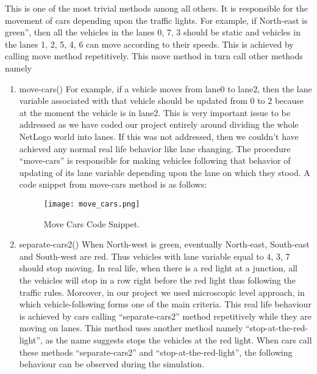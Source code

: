 \documentclass[11pt,a4paper]{article}
\begin{document}
This is one of the most trivial methods among all others. It is responsible for the movement of cars depending upon the traffic lights. For example, if North-east is green”, then all the vehicles in the lanes 0, 7, 3 should be static and vehicles in the lanes 1, 2, 5, 4, 6 can move according to their speeds. This is achieved by calling move method repetitively. This move method in turn call other methods namely\newline
\begin{enumerate}
\item move-cars()\newline
For example, if a vehicle moves from lane0 to lane2, then the lane variable associated with that vehicle should be updated from 0 to 2 because at the moment the vehicle is in lane2. This is very important issue to be addressed as we have coded our project entirely around dividing the whole NetLogo world into lanes. If this was not addressed, then we couldn’t have achieved any normal real life behavior like lane changing. The procedure “move-cars” is responsible for making vehicles following that behavior of updating of its lane variable depending upon the lane on which they stood.
A code snippet from move-cars method is as follows:

\begin{figure}[!ht]
\centering
\texttt{[image: move\_cars.png]}
\caption{\label{fig:mc}Move Cars Code Snippet.}
\end{figure}

\item separate-cars2()\newline
When North-west is green, eventually North-east, South-east and South-west are red. Thus vehicles with lane variable equal to 4, 3, 7 should stop moving. In real life, when there is a red light at a junction, all the vehicles will stop in a row right before the red light thus following the traffic rules.\newline
Moreover, in our project we used microscopic level approach, in which vehicle-following forms one of the main criteria. This real life behaviour is achieved by cars calling “separate-cars2” method repetitively while they are moving on lanes.\newline 
This method uses another method namely “stop-at-the-red-light”, as the name suggests stops the vehicles at the red light. When cars call these methods “separate-cars2” and “stop-at-the-red-light”, the following behaviour can be observed during the simulation.\newline 
\end{enumerate}
                         
\end{document}
